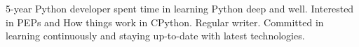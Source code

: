 
5-year Python developer spent time in learning Python deep and well. Interested in PEPs and How things work in CPython. Regular writer. Committed in learning continuously and staying up-to-date with latest technologies.
